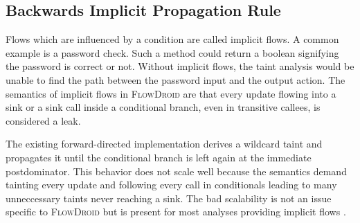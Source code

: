 \documentclass[../draft.tex]{subfiles}
\begin{document}
    \subsection{Backwards Implicit Propagation Rule}
    Flows which are influenced by a condition are called implicit flows. 
    A common example is a password check. 
    Such a method could return a boolean signifying the password is correct or not. 
    Without implicit flows, the taint analysis would be unable to find the path between the password input and the output action. 
    The semantics of implicit flows in \textsc{FlowDroid} are that every update flowing into a sink or a sink call inside a conditional branch, even in transitive callees, is considered a leak.
    
    The existing forward-directed implementation derives a wildcard taint\footnotemark{} and propagates it until the conditional branch is left again at the immediate postdominator. 
    This behavior does not scale well because the semantics demand tainting every update and following every call in conditionals leading to many unneccessary taints never reaching a sink.
    The bad scalability is not an issue specific to \textsc{FlowDroid} but is present for most analyses providing implicit flows \cite{King2008}.
\end{document}
